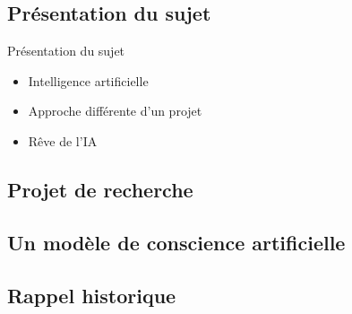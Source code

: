 \subsection{Présentation du sujet}
\begin{frame}{Présentation du sujet}
	\begin{itemize}
		\item Intelligence artificielle
		\pause
		\item Approche différente d'un projet
		\pause
		\item Rêve de l'IA
	\end{itemize}
\end{frame}

\subsection{Projet de recherche}


\subsection{Un modèle de conscience artificielle}


\subsection{Rappel historique}



